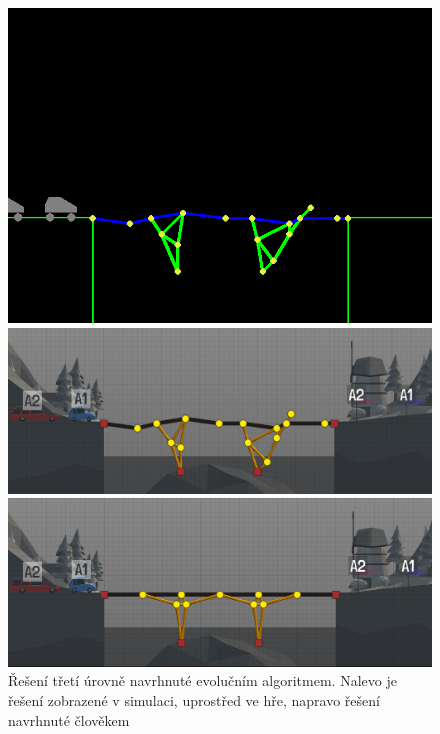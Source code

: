 \begin{figure}[ht]
    \centering
    \begin{minipage}{0.32\textwidth}
        \centering
        \includegraphics[width=\linewidth]{img/lvl3-sim-ea}
    \end{minipage}\hfill
    \begin{minipage}{0.32\textwidth}
        \centering
        \includegraphics[width=\linewidth]{img/lvl3-poly-ea}
    \end{minipage}
    \begin{minipage}{0.32\textwidth}
        \centering
        \includegraphics[width=\linewidth]{img/lvl3-poly-human}
    \end{minipage}
    \caption{Řešení třetí úrovně navrhnuté evolučním algoritmem. Nalevo je řešení zobrazené v simulaci, uprostřed ve hře, napravo řešení navrhnuté člověkem}
    \label{exp:lvl3}
\end{figure}

